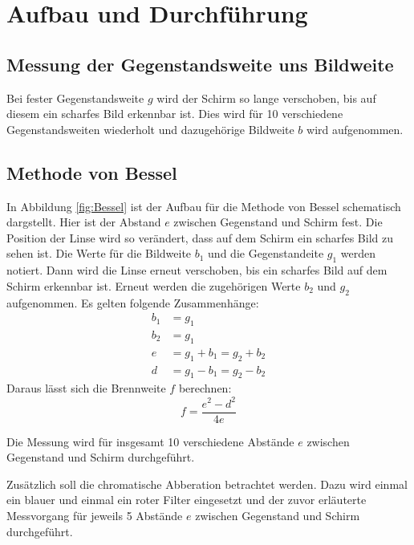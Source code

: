 \section {Aufbau und Durchführung}
\label{sec:durchführung}
\subsection{Messung der Gegenstandsweite uns Bildweite}
Bei fester Gegenstandsweite $g$ wird der Schirm so lange verschoben, bis auf diesem ein scharfes Bild erkennbar ist. Dies wird für 10 verschiedene Gegenstandsweiten wiederholt und dazugehörige Bildweite $b$ wird aufgenommen.

\subsection{Methode von Bessel}
In Abbildung \ref{fig:Bessel} ist der Aufbau für die Methode von Bessel schematisch dargstellt. Hier ist der Abstand $e$ zwischen Gegenstand und Schirm fest. Die Position der Linse wird so verändert, dass auf dem Schirm ein scharfes Bild zu sehen ist. Die Werte für die Bildweite $b_1$ und die Gegenstandeite $g_1$ werden notiert. Dann wird die Linse erneut verschoben, bis ein scharfes Bild auf dem Schirm erkennbar ist. Erneut werden die zugehörigen Werte $b_2$ und $g_2$ aufgenommen.
Es gelten folgende Zusammenhänge:
\begin{align}
  b_1 &= g_1 \\
  b_2 &= g_1 \\
  e &= g_1+b_1 =g_2+b_2 \\
  d &= g_1 - b_1 = g_2 -b_2
\end{align}
Daraus lässt sich die Brennweite $f$ berechnen:
\begin{equation}
  f = \frac{e^2 - d^2}{4e}
\end{equation}

Die Messung wird für insgesamt 10 verschiedene Abstände $e$ zwischen Gegenstand und Schirm durchgeführt.

Zusätzlich soll die chromatische Abberation betrachtet werden. Dazu wird einmal ein blauer und einmal ein roter Filter eingesetzt und der zuvor erläuterte Messvorgang für jeweils 5 Abstände $e$ zwischen Gegenstand und Schirm durchgeführt.

